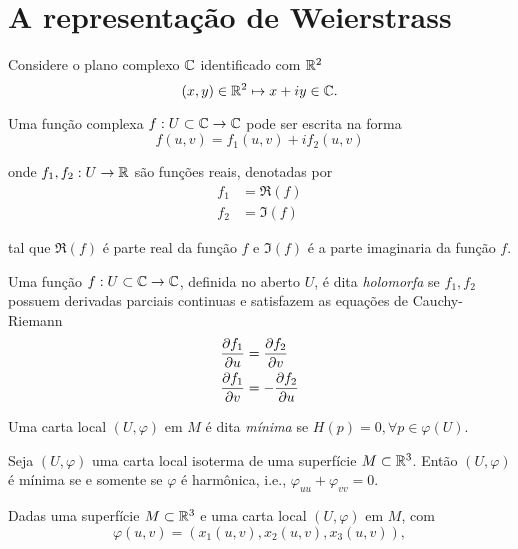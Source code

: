 \section{A representação de Weierstrass}

Considere o plano complexo $\mathbb{C}$ identificado com $\mathbb{R}^2$
\begin{equation*}
(x,y) \in \mathbb{R}^2 \mapsto x + iy \in \mathbb{C}.
\end{equation*}

Uma função complexa $f: U \subset \mathbb{C} \rightarrow \mathbb{C}$ pode ser escrita na forma
\begin{equation*}
f(u,v) = f_1(u,v) + i f_2(u,v)
\end{equation*}

onde $f_1, f_2: U \rightarrow \mathbb{R}$ são funções reais, denotadas por
\begin{align*}
f_1 &= \Re(f)\\
f_2 &= \Im(f)
\end{align*}

tal que $\Re(f)$ é parte real da função $f$ e $\Im(f)$ é a parte imaginaria da função $f$.

\begin{definicao}
	Uma função $f: U \subset \mathbb{C} \rightarrow \mathbb{C}$, definida no aberto $U$, é dita \emph{holomorfa} se $f_1, f_2$ possuem derivadas parciais continuas e satisfazem as equações de Cauchy-Riemann
	\begin{align*}
	\frac{\partial f_1}{\partial u} &= \frac{\partial f_2}{\partial v}\\
	\frac{\partial f_1}{\partial v} &= - \frac{\partial f_2}{\partial u}
	\end{align*}
\end{definicao}

\begin{definicao}
	Uma carta local $(U, \varphi)$ em $M$ é dita \emph{mínima} se $H(p) = 0, \forall p \in \varphi(U)$.
\end{definicao}

\begin{corolario}\label{equiv_isoterma_harmonica}
	Seja $(U, \varphi)$ uma carta local isoterma de uma superfície $M \subset \mathbb{R}^3$. Então $(U, \varphi)$ é mínima se e somente se $\varphi$ é harmônica, i.e., $\varphi_{uu} + \varphi_{vv} = 0$.
\end{corolario}

Dadas uma superfície $M \subset \mathbb{R}^3$ e uma carta local $(U, \varphi)$ em $M$, com
\begin{equation*}
\varphi(u,v) = (x_1(u,v), x_2(u,v), x_3(u,v)),
\end{equation*}

